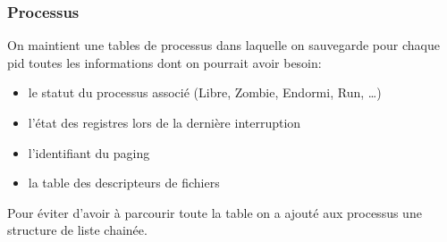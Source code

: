 \documentclass[10pt,a4paper]{beamer}
\begin{document}
\begin{frame}
  \frametitle{Processus}

  On maintient une tables de processus dans laquelle on sauvegarde pour chaque pid toutes les informations dont on pourrait avoir besoin:

  \begin{itemize}
  \item le statut du processus associé (\textrm{Libre}, \textrm{Zombie}, \textrm{Endormi}, \textrm{Run}, \ldots)
  \item l'état des registres lors de la dernière interruption
  \item l'identifiant du paging
  \item la table des descripteurs de fichiers
  \end{itemize}

  Pour éviter d'avoir à parcourir toute la table on a ajouté aux processus une structure de liste chainée.



\end{frame}
\end{document}
